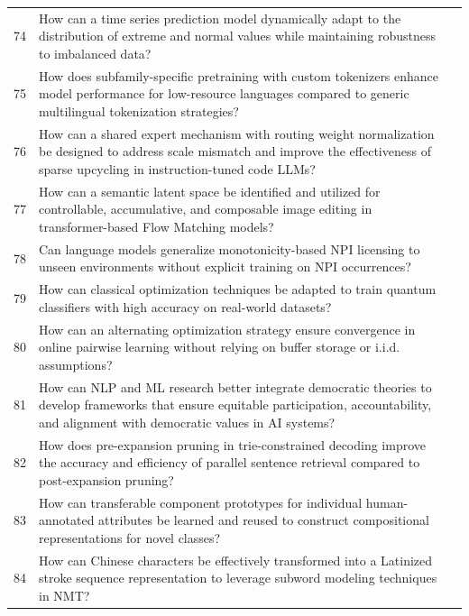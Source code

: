 \begin{longtable}{p{0.8cm}p{9cm}p{2.5cm}}
74 & How can a time series prediction model dynamically adapt to the distribution of extreme and normal values while maintaining robustness to imbalanced data? & \cite{10.1609/aaai.v37i7.26045} \\
75 & How does subfamily-specific pretraining with custom tokenizers enhance model performance for low-resource languages compared to generic multilingual tokenization strategies? & \cite{10.18653/v1/2023.findings-eacl.93} \\
76 & How can a shared expert mechanism with routing weight normalization be designed to address scale mismatch and improve the effectiveness of sparse upcycling in instruction-tuned code LLMs? & \cite{10.18653/v1/2024.acl-long.699} \\
77 & How can a semantic latent space be identified and utilized for controllable, accumulative, and composable image editing in transformer-based Flow Matching models? & \cite{10.1609/aaai.v38i3.27998} \\
78 & Can language models generalize monotonicity-based NPI licensing to unseen environments without explicit training on NPI occurrences? & \cite{10.18653/v1/2021.findings-acl.439} \\
79 & How can classical optimization techniques be adapted to train quantum classifiers with high accuracy on real-world datasets? & \cite{10.1609/aaai.v35i18.17941} \\
80 & How can an alternating optimization strategy ensure convergence in online pairwise learning without relying on buffer storage or i.i.d. assumptions? & \cite{10.1609/aaai.v38i10.28955} \\
81 & How can NLP and ML research better integrate democratic theories to develop frameworks that ensure equitable participation, accountability, and alignment with democratic values in AI systems? & \cite{10.18653/v1/2024.emnlp-main.184} \\
82 & How does pre-expansion pruning in trie-constrained decoding improve the accuracy and efficiency of parallel sentence retrieval compared to post-expansion pruning? & \cite{10.18653/v1/2020.acl-main.152} \\
83 & How can transferable component prototypes for individual human-annotated attributes be learned and reused to construct compositional representations for novel classes? & \cite{10.1609/aaai.v37i7.26082} \\
84 & How can Chinese characters be effectively transformed into a Latinized stroke sequence representation to leverage subword modeling techniques in NMT? & \cite{10.18653/v1/2022.emnlp-main.434} \\

\end{longtable}
